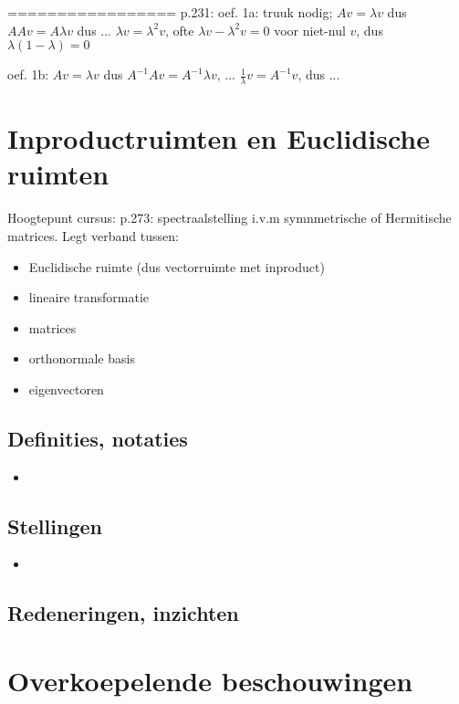\documentclass{article}
\begin{document}
=================
p.231: oef. 1a: truuk nodig; $Av=\lambda v$ dus $AAv= A\lambda v$ dus ... $\lambda v = \lambda^2 v$, ofte  $\lambda v - \lambda^2 v = 0$ voor niet-nul $v$, dus $\lambda(1-\lambda)=0$

oef. 1b: $Av=\lambda v$ dus $A^{-1}Av = A^{-1} \lambda v$, ... $\frac{1}{\lambda}v= A^{-1}v$, dus ... 




\section{Inproductruimten en Euclidische ruimten}



Hoogtepunt cursus: p.273: spectraalstelling i.v.m symnmetrische of Hermitische matrices. 
Legt verband tussen: 

\begin{itemize}
    \item Euclidische ruimte (dus vectorruimte met inproduct)
    \item lineaire transformatie
    \item matrices
    \item orthonormale basis
    \item eigenvectoren
\end{itemize}


\subsection{Definities, notaties}
\begin{itemize}
    \item 
\end{itemize}

\subsection{Stellingen}
\begin{itemize}
    \item 
\end{itemize}

\subsection{Redeneringen, inzichten}


\section{Overkoepelende beschouwingen}
\end{document}
